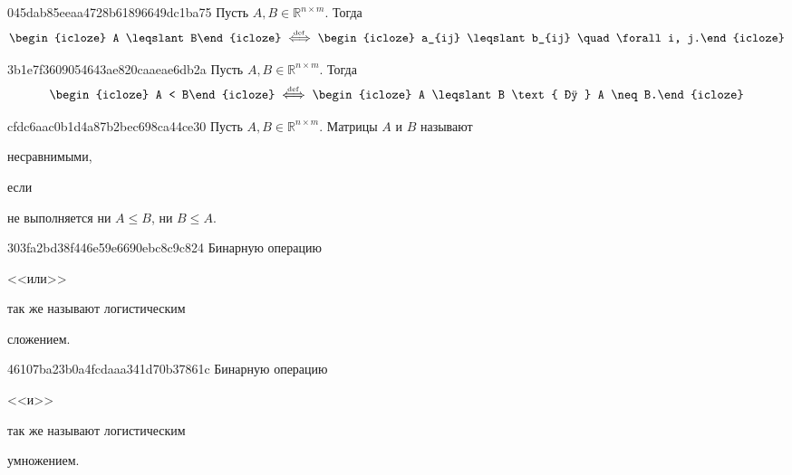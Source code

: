 \begin{note}{045dab85eeaa4728b61896649dc1ba75}
    Пусть \({ A, B \in \mathbb R^{n \times m} }\).
    Тогда
    \[
        \begin{icloze}{2}A \leqslant B\end{icloze} \overset{\hspace{-1pt}\text{\tiny def}}\iff \begin{icloze}{1}a_{ij} \leqslant b_{ij} \quad \forall i, j.\end{icloze}
    \]
\end{note}

\begin{note}{3b1e7f3609054643ae820caaeae6db2a}
    Пусть \({ A, B \in \mathbb R^{n \times m} }\).
    Тогда
    \[
        \begin{icloze}{2}A < B\end{icloze} \overset{\hspace{-1pt}\text{\tiny def}}\iff \begin{icloze}{1}A \leqslant B \text{ и } A \neq B.\end{icloze}
    \]
\end{note}

\begin{note}{cfdc6aac0b1d4a87b2bec698ca44ce30}
    Пусть \({ A, B \in \mathbb R^{n \times m} }\).
    Матрицы \({ A }\) и \({ B }\) называют \begin{icloze}{2}несравнимыми,\end{icloze} если \begin{icloze}{1}не выполняется ни \({ A \leqslant B }\), ни \({ B \leqslant A }\).\end{icloze}
\end{note}

\begin{note}{303fa2bd38f446e59e6690ebc8c9c824}
    Бинарную операцию \begin{icloze}{2}<<или>>\end{icloze} так же называют логистическим \begin{icloze}{1}сложением.\end{icloze}
\end{note}

\begin{note}{46107ba23b0a4fcdaaa341d70b37861c}
    Бинарную операцию \begin{icloze}{2}<<и>>\end{icloze} так же называют логистическим \begin{icloze}{1}умножением.\end{icloze}
\end{note}

